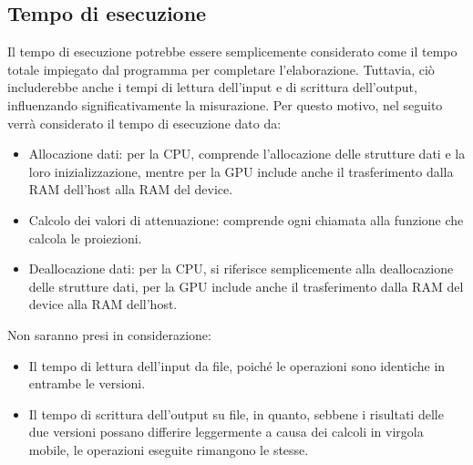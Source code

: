 \documentclass[12pt,a4paper]{report}
\begin{document}
\subsection{Tempo di esecuzione}

Il tempo di esecuzione potrebbe essere semplicemente considerato come il tempo totale impiegato dal programma per completare
l'elaborazione.
Tuttavia, ciò includerebbe anche i tempi di lettura dell'input e di scrittura dell'output, influenzando significativamente la
misurazione.
Per questo motivo, nel seguito verrà considerato il tempo di esecuzione dato da:
\begin{itemize}
  \item Allocazione dati: per la CPU, comprende l'allocazione delle strutture dati e la loro inizializzazione, mentre per la
        GPU include anche il trasferimento dalla RAM dell'host alla RAM del device.
  \item Calcolo dei valori di attenuazione: comprende ogni chiamata alla funzione che calcola le proiezioni.
  \item Deallocazione dati: per la CPU, si riferisce semplicemente alla deallocazione delle strutture dati, per la GPU include
        anche il trasferimento dalla RAM del device alla RAM dell'host.
\end{itemize}
Non saranno presi in considerazione:
\begin{itemize}
  \item Il tempo di lettura dell'input da file, poiché le operazioni sono identiche in entrambe le versioni.
  \item Il tempo di scrittura dell'output su file, in quanto, sebbene i risultati delle due versioni possano differire leggermente
        a causa dei calcoli in virgola mobile, le operazioni eseguite rimangono le stesse.
\end{itemize}
\end{document}
